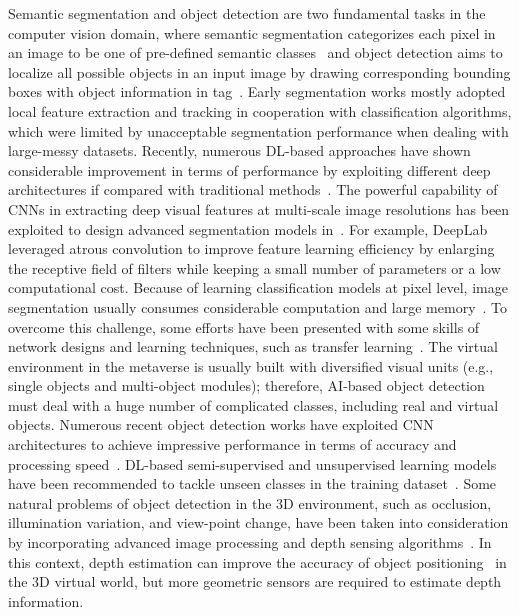 \documentclass[journal]{IEEEtran}
\begin{document}
Semantic segmentation and object detection are two fundamental tasks in the computer vision domain, where semantic segmentation categorizes each pixel in an image to be one of pre-defined semantic classes~\cite{liu2021visual} and object detection aims to localize all possible objects in an input image by drawing corresponding bounding boxes with object information in tag~\cite{huynh2016nic}. 
Early segmentation works mostly adopted local feature extraction and tracking in cooperation with classification algorithms, which were limited by unacceptable segmentation performance when dealing with large-messy datasets. Recently, numerous DL-based approaches have shown considerable improvement in terms of performance by exploiting different deep architectures if compared with traditional methods~\cite{minaee2021image}. The powerful capability of CNNs in extracting deep visual features at multi-scale image resolutions has been exploited to design advanced segmentation models in~\cite{long2015fully, shelhamer2017fully, chen2018deeplab, wei2016stc, zhou2019unet++}. For example, DeepLab~\cite{chen2018deeplab} leveraged atrous convolution to improve feature learning efficiency by enlarging the receptive field of filters while keeping a small number of parameters or a low computational cost. Because of learning classification models at pixel level, image segmentation usually consumes considerable computation and large memory~\cite{hua2020cross, hua2018convolutional}. To overcome this challenge, some efforts have been presented with some skills of network designs and learning techniques, such as transfer learning~\cite{liu2019structured}. The virtual environment in the metaverse is usually built with diversified visual units (e.g., single objects and multi-object modules); therefore, AI-based object detection must deal with a huge number of complicated classes, including real and virtual objects. Numerous recent object detection works have exploited CNN architectures to achieve impressive performance in terms of accuracy and processing speed~\cite{cheng2018improved, zhu2018attention, liu2020picanet}. DL-based semi-supervised and unsupervised learning models have been recommended to tackle unseen classes in the training dataset~\cite{tang2018visual}. Some natural problems of object detection in the 3D environment, such as occlusion, illumination variation, and view-point change, have been taken into consideration by incorporating advanced image processing and depth sensing algorithms~\cite{chen20183d, feng2021relation}. In this context, depth estimation can improve the accuracy of object positioning~\cite{lai2019real} in the 3D virtual world, but more geometric sensors are required to estimate depth information.
\end{document}
